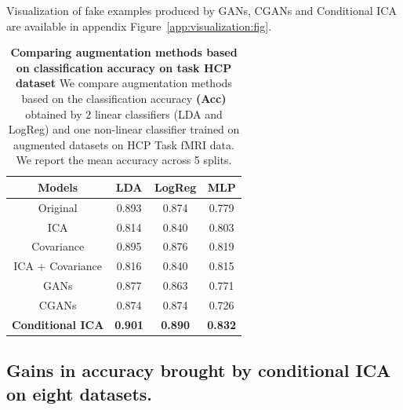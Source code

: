 Visualization of fake examples produced by GANs, CGANs and Conditional ICA are available in appendix Figure~\ref{app:visualization:fig}.
%
\begin{table}[!b]
  \setlength{\tabcolsep}{0.23em}
\begin{center}
  \begin{tabular}{c|c|c|c}
    \hline
    Models & LDA & LogReg & MLP \\
    \hline
    Original           & 0.893 & 0.874 &  0.779 \\
    ICA                & 0.814 & 0.840 &  0.803 \\
    Covariance         & 0.895 & 0.876 &  0.819 \\
    ICA + Covariance   & 0.816 & 0.840 &  0.815 \\
    GANs               & 0.877 & 0.863 &  0.771 \\
    CGANs              & 0.874 & 0.874 &   0.726 \\
    \hline
    \textbf{Conditional ICA} &  \textbf{0.901} & \textbf{0.890} & \textbf{0.832} \\
    \hline\hline
\end{tabular}
\end{center}
\caption{\textbf{Comparing augmentation methods based on classification accuracy on task
      HCP dataset} We compare augmentation methods based on the classification
    accuracy \textbf{(Acc)} obtained by 2 linear classifiers (LDA and LogReg) and one
    non-linear classifier trained on augmented datasets on HCP
  Task fMRI data. We report the mean accuracy across 5 splits.}\label{tab3}
\end{table}




\subsection{Gains in accuracy brought by conditional ICA on eight datasets.}


